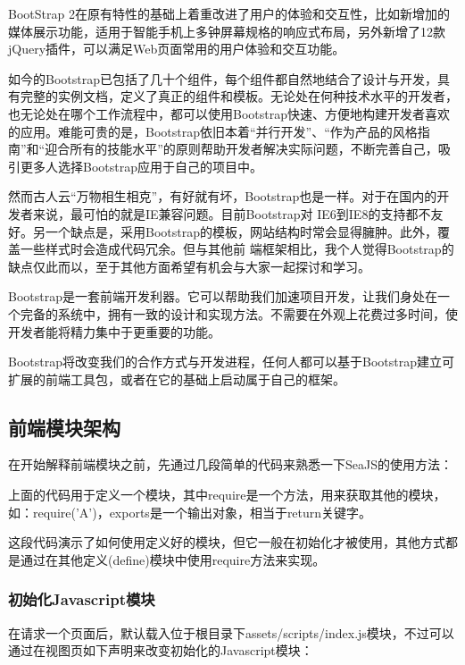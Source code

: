 \indent
BootStrap 2在原有特性的基础上着重改进了用户的体验和交互性，比如新增加的媒体展示功能，适用于智能手机上多钟屏幕规格的响应式布局，另外新增了12款jQuery插件，可以满足Web页面常用的用户体验和交互功能。

\indent
如今的Bootstrap已包括了几十个组件，每个组件都自然地结合了设计与开发，具有完整的实例文档，定义了真正的组件和模板。无论处在何种技术水平的开发者，也无论处在哪个工作流程中，都可以使用Bootstrap快速、方便地构建开发者喜欢的应用。难能可贵的是，Bootstrap依旧本着“并行开发”、“作为产品的风格指南”和“迎合所有的技能水平”的原则帮助开发者解决实际问题，不断完善自己，吸引更多人选择Bootstrap应用于自己的项目中。

\indent
然而古人云“万物相生相克”，有好就有坏，Bootstrap也是一样。对于在国内的开发者来说，最可怕的就是IE兼容问题。目前Bootstrap对 IE6到IE8的支持都不友好。另一个缺点是，采用Bootstrap的模板，网站结构时常会显得臃肿。此外，覆盖一些样式时会造成代码冗余。但与其他前 端框架相比，我个人觉得Bootstrap的缺点仅此而以，至于其他方面希望有机会与大家一起探讨和学习。

\indent
Bootstrap是一套前端开发利器。它可以帮助我们加速项目开发，让我们身处在一个完备的系统中，拥有一致的设计和实现方法。不需要在外观上花费过多时间，使开发者能将精力集中于更重要的功能。

\indent
Bootstrap将改变我们的合作方式与开发进程，任何人都可以基于Bootstrap建立可扩展的前端工具包，或者在它的基础上启动属于自己的框架。



\subsection{前端模块架构}
在开始解释前端模块之前，先通过几段简单的代码来熟悉一下SeaJS的使用方法：

\indent
上面的代码用于定义一个模块，其中require是一个方法，用来获取其他的模块，如：require('A')，exports是一个输出对象，相当于return关键字。


\indent
这段代码演示了如何使用定义好的模块，但它一般在初始化才被使用，其他方式都是通过在其他定义(define)模块中使用require方法来实现。

\subsubsection{初始化Javascript模块}
在请求一个页面后，默认载入位于根目录下assets/scripts/index.js模块，不过可以通过在视图页如下声明来改变初始化的Javascript模块：


